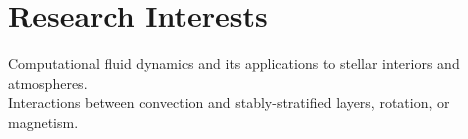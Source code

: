 \section{Research Interests}

Computational fluid dynamics and its applications to stellar interiors and atmospheres. \\
Interactions between convection and stably-stratified layers, rotation, or magnetism.

